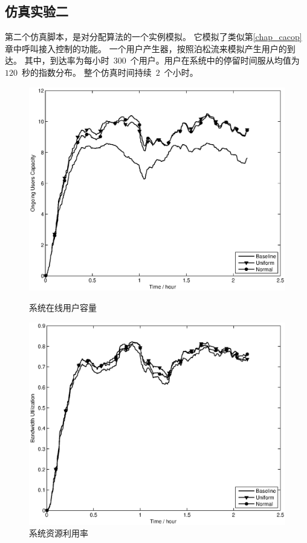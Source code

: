 \subsection{仿真实验二}
第二个仿真脚本，是对分配算法的一个实例模拟。
它模拟了类似第\ref{chap_cacop}章中呼叫接入控制的功能。
一个用户产生器，按照泊松流来模拟产生用户的到达。
其中，到达率为每小时~$300$~个用户。用户在系统中的停留时间服从均值为~$120$~秒的指数分布。
整个仿真时间持续~$2$~个小时。
\begin{figure}[htbp] 
   \centering
  \begin{minipage}[t]{0.65\linewidth} 
    \centering 
    \includegraphics[width=\textwidth]{bayesian_time_vs_ongoing_user_number.eps} 
    \caption{系统在线用户容量} 
    \label{fig:chap_bayesian:time_vs_ongoing_user_number} 
  \end{minipage} 

  \centering
  \begin{minipage}[t]{0.65\linewidth} 
    \centering 
    \includegraphics[width=\textwidth]{bayesian_time_vs_bw_utilization.eps} 
    \caption{系统资源利用率} 
    \label{fig:chap_bayesian:time_vs_bw_utilization} 
  \end{minipage} 
\end{figure}

